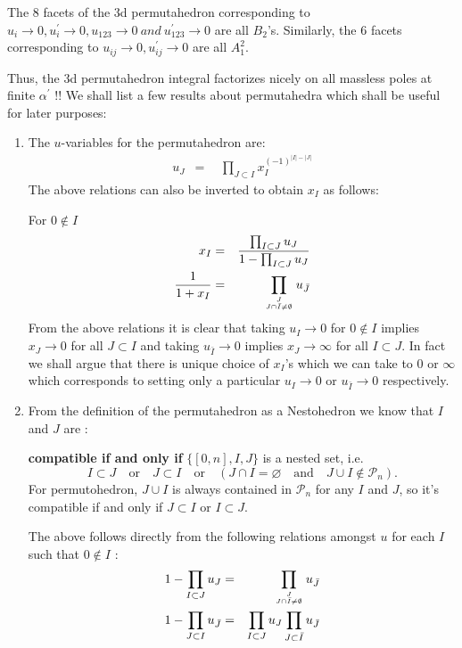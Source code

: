 \documentclass[hidelinks,12pt]{article}
\newcommand{\bea}[1]{\begin{eqnarray}\label{#1} }
\newcommand{\eea}{\end{eqnarray}}
\def\bea{\begin{eqnarray}}
\def\eea{\end{eqnarray}}
\begin{document}
The 8 facets of the 3d permutahedron corresponding to $u_i \rightarrow 0, u^{'}_i \rightarrow 0,u_{123} \rightarrow 0 ~and ~u^{'}_{123} \rightarrow 0$  are all $B_2$'s. Similarly, the 6 facets corresponding to  $u_{ij} \rightarrow 0, u^{'}_{ij} \rightarrow 0$ are all  $A^{2}_1$.

Thus, the 3d permutahedron integral factorizes nicely on all massless poles at finite $\alpha^{'}$ !!
We shall list a few results about permutahedra which shall be useful for later purposes: 
\begin{enumerate}
\item The $u$-variables for the permutahedron are: 
\bea
u_J &=& ~~\prod_{J \subset I} x_I^{(-1)^{|I|-|J|}} \nonumber 
\eea
The above relations can also be inverted to obtain $x_I$ as follows:

For $0 \notin I $
\bea
x_I &=& \frac{\prod_{I \subset J} u_{J}}{1-\prod_{I \subset J} u_{J}} \\
\frac{1}{1+ x_I} &=& \prod_{{J}\atop{J\cap \bar{I} \ne \emptyset}} u_{\bar{J}}
\eea
From the above relations it is clear that taking $u_I \rightarrow 0$ for $0 \notin I$ implies $x_J \rightarrow 0$ for all $J \subset I$ and taking $u_{\bar{I}} \rightarrow 0$ implies $x_J \rightarrow \infty $ for all $I \subset J$.
In fact we shall argue that there is unique choice of $x_I$'s which we can take to $0$ or $\infty$ which corresponds to setting only a particular $u_I \rightarrow 0$ or $u_{\bar{I}} \rightarrow 0$ respectively.
\item From the definition of the permutahedron as a Nestohedron we know that $I$ and $J$ are :



{\bf compatible if and only if} $\{[0,n],I,J\}$ is a nested set, i.e.
\[
I\subset J\quad \text{or}\quad J\subset I\quad \text{or}\quad (J\cap I=\varnothing \quad \text{and}\quad J\cup I\not\in \mathscr P_n).
\]
For permutohedron, $J\cup I$ is always contained in $\mathscr P_n$ for any $I$ and $J$, so it's compatible if and only if $J\subset I$ or $I\subset J$.

The above  follows directly from the following relations amongst $u$ for each $I$ such that $0\notin I$ :
\bea
1-\prod_{I \subset J} u_{J} &=& \prod_{{J}\atop{J\cap \bar{I} \ne \emptyset}} u_{\bar{J}} \\
1-\prod_{J \subset I} u_{\bar{J}} &=& \prod_{I \subset J} u_{J} \prod_{J \subset \bar{I} } u_{\bar{J}}
\eea



\end{enumerate}
\end{document}
